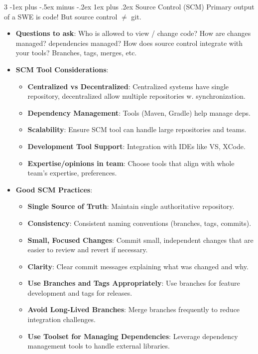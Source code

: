 \documentclass[a4paper, 10pt, landscape]{article}
\makeatletter
\renewcommand{\subsubsection}{\@startsection{subsubsection}{3}{0mm}%
                                {-1ex plus -.5ex minus -.2ex}%
                                {1ex plus .2ex}%
                                {\normalfont\small\bfseries}}
\makeatother
\begin{document}
\begin{multicols*}{3}
\subsubsection{Source Control (SCM)}
Primary output of a SWE is code! But source control $\neq$ git. 
\begin{itemize}[itemsep=-1pt]
\item \textbf{Questions to ask}: Who is allowed to view / change code? How are changes managed? dependencies managed? How does source control integrate with your tools? Branches, tags, merges, etc.
\item \textbf{SCM Tool Considerations}:
	\begin{itemize}
	\item \textbf{Centralized vs Decentralized}: Centralized systems have single repository, decentralized allow multiple repositories w. synchronization.
	\item \textbf{Dependency Management}: Tools (Maven, Gradle) help manage deps.
	\item \textbf{Scalability}: Ensure SCM tool can handle large repositories and teams.
	\item \textbf{Development Tool Support}: Integration with IDEs like VS, XCode.
	\item \textbf{Expertise/opinions in team}: Choose tools that align with whole team's expertise, preferences.
	\end{itemize}
\item \textbf{Good SCM Practices}:
	\begin{itemize}
	\item \textbf{Single Source of Truth}: Maintain single authoritative repository.
	\item \textbf{Consistency}: Consistent naming conventions (branches, tags, commits).
	\item \textbf{Small, Focused Changes}: Commit small, independent changes that are easier to review and revert if necessary.
	\item \textbf{Clarity}: Clear commit messages explaining what was changed and why.
	\item \textbf{Use Branches and Tags Appropriately}: Use branches for feature development and tags for releases.
	\item \textbf{Avoid Long-Lived Branches}: Merge branches frequently to reduce integration challenges.
	\item \textbf{Use Toolset for Managing Dependencies}: Leverage dependency management tools to handle external libraries.
	\end{itemize}
\end{itemize}


\end{multicols*}
\end{document}
